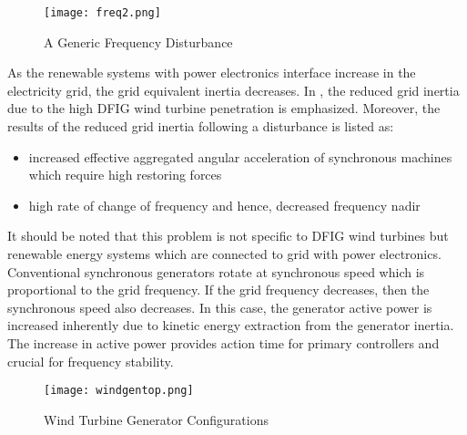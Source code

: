 \begin{figure}[h!]
	\centering
	\texttt{[image: freq2.png]}
	\caption{A Generic Frequency Disturbance}
	\label{freq2}
\end{figure}
As the renewable systems with power electronics interface increase in the electricity grid, the grid equivalent inertia decreases. In \cite{Gautam2011}, the reduced grid inertia due to the high DFIG wind turbine penetration is emphasized. Moreover, the results of the reduced grid inertia following a disturbance is listed as: 
\begin{itemize}
	\item increased effective aggregated angular acceleration of synchronous machines which require high restoring forces
	\item high rate of change of frequency and hence, decreased frequency nadir
\end{itemize}
It should be noted that this problem is not specific to DFIG wind turbines but renewable energy systems which are connected to grid with power electronics. Conventional synchronous generators rotate at synchronous speed which is proportional to the grid frequency. If the grid frequency decreases, then the synchronous speed also decreases. In this case, the generator active power is increased inherently due to kinetic energy extraction from the generator inertia. The increase in active power provides action time for primary controllers and crucial for frequency stability. \par
\begin{figure}[h!]
	\centering
	\texttt{[image: windgentop.png]}
	\caption{Wind Turbine Generator Configurations \cite{Muljadi2012}}
	\label{windtop}
\end{figure}
